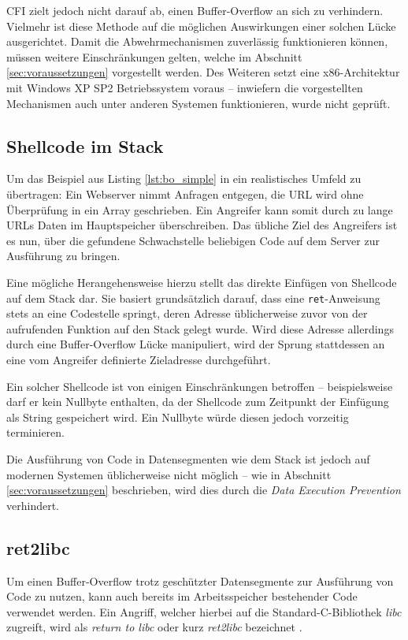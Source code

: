\documentclass[12pt,%
               oneside,
               a4paper]{uiothesis}
\begin{document}
CFI zielt jedoch nicht darauf ab, einen Buffer-Overflow an sich zu verhindern. Vielmehr ist diese Methode auf die möglichen Auswirkungen einer solchen Lücke ausgerichtet. Damit die Abwehrmechanismen zuverlässig funktionieren können, müssen weitere Einschränkungen gelten, welche im Abschnitt \ref{sec:voraussetzungen} vorgestellt werden. Des Weiteren setzt \cite{Abadi.2009} eine x86-Architektur mit Windows XP SP2 Betriebssystem voraus -- inwiefern die vorgestellten Mechanismen auch unter anderen Systemen funktionieren, wurde nicht geprüft.

\subsection{Shellcode im Stack}

Um das Beispiel aus Listing \ref{lst:bo_simple} in ein realistisches Umfeld zu übertragen: Ein Webserver nimmt Anfragen entgegen, die URL wird ohne Überprüfung in ein Array geschrieben. Ein Angreifer kann somit durch zu lange URLs Daten im Hauptspeicher überschreiben. Das übliche Ziel des Angreifers ist es nun, über die gefundene Schwachstelle beliebigen Code auf dem Server zur Ausführung zu bringen.

Eine mögliche Herangehensweise hierzu stellt das direkte Einfügen von Shellcode auf dem Stack dar. Sie basiert grundsätzlich darauf, dass eine \texttt{ret}-Anweisung stets an eine Codestelle springt, deren Adresse üblicherweise zuvor von der aufrufenden Funktion auf den Stack gelegt wurde. Wird diese Adresse allerdings durch eine Buffer-Overflow Lücke manipuliert, wird der Sprung stattdessen an eine vom Angreifer definierte Zieladresse durchgeführt.

Ein solcher Shellcode ist von einigen Einschränkungen betroffen -- beispielsweise darf er kein Nullbyte enthalten, da der Shellcode zum Zeitpunkt der Einfügung als String gespeichert wird. Ein Nullbyte würde diesen jedoch vorzeitig terminieren.

Die Ausführung von Code in Datensegmenten wie dem Stack ist jedoch auf modernen Systemen üblicherweise nicht möglich -- wie in Abschnitt \ref{sec:voraussetzungen} beschrieben, wird dies durch die \emph{Data Execution Prevention} verhindert.

\subsection{ret2libc}

Um einen Buffer-Overflow trotz geschützter Datensegmente zur Ausführung von Code zu nutzen, kann auch bereits im Arbeitsspeicher bestehender Code verwendet werden. Ein Angriff, welcher hierbei auf die Standard-C-Bibliothek \emph{libc} zugreift, wird als \emph{return to libc} oder kurz \emph{ret2libc} bezeichnet \cite[S.\,412]{Erickson.2009}.
\end{document}

